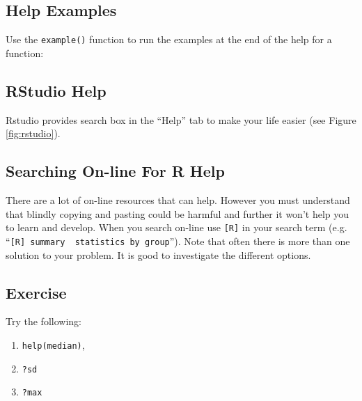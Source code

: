 \documentclass[letterpaperpaper,9pt,twocolumn,twoside,printwatermark=false]{pinp}
\providecommand{\tightlist}{%
  \setlength{\itemsep}{0pt}\setlength{\parskip}{0pt}}
\begin{document}
\hypertarget{help-examples}{%
\subsection{Help Examples}\label{help-examples}}

Use the \texttt{example()} function to run the examples at the end of
the help for a function:

\begin{Shaded}
\begin{Highlighting}[]
\CommentTok{#  }
\CommentTok{#  }
\CommentTok{#  }
\end{Highlighting}
\end{Shaded}

\hypertarget{rstudio-help}{%
\subsection{RStudio Help}\label{rstudio-help}}

Rstudio provides search box in the ``Help'' tab to make your life easier
(see Figure \ref{fig:rstudio}).

\hypertarget{searching-on-line-for-r-help}{%
\subsection{Searching On-line For R
Help}\label{searching-on-line-for-r-help}}

There are a lot of on-line resources that can help. However you must
understand that blindly copying and pasting could be harmful and further
it won't help you to learn and develop. When you search on-line use
\texttt{{[}R{]}} in your search term (e.g.
``\texttt{{[}R{]}\ summary\ \ statistics\ by\ group}''). Note that often
there is more than one solution to your problem. It is good to
investigate the different options.

\hypertarget{exercise}{%
\subsection{Exercise}\label{exercise}}

Try the following:

\begin{enumerate}
\def\labelenumi{\arabic{enumi}.}
\tightlist
\item
  \texttt{help(median)},
\item
  \texttt{?sd}
\item
  \texttt{?max}
\end{enumerate}
\end{document}
